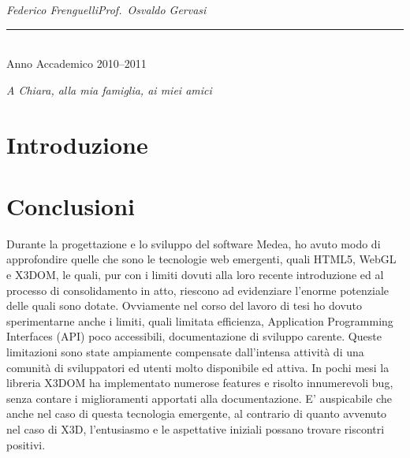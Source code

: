 \documentclass[a4paper,12pt]{report}
\def\laureando{Federico Frenguelli}
\def\annoaccademico{2010--2011}
\def\dedica{A Chiara, alla mia famiglia, ai miei amici}
\newlength\corpo
\begin{document}
\begin{titlepage}
\hspace{0.0cm}\emph{\laureando}\hfill\emph{Prof.~Osvaldo Gervasi}\par

\vfill


\begin{center}

\rule{40mm}{0.01mm}\\

Anno Accademico \annoaccademico

\end{center}

\end{titlepage}
\newpage
\vspace*{2.5cm}
\begin{flushright}
\begin{Large}\emph{\dedica}\end{Large}
\end{flushright}
\frenchspacing
%

\tableofcontents
\listoffigures
{}
\chapter*{Introduzione}
\pagestyle{fancy}
\fancyfoot[RO]{\thepage \hfil}



\chapter*{Conclusioni}
Durante la progettazione e lo sviluppo del software Medea, ho avuto modo di approfondire quelle che sono le  tecnologie web emergenti, quali HTML5, WebGL e X3DOM, le quali, pur con i limiti dovuti alla loro recente introduzione ed al processo di consolidamento in atto,  riescono ad evidenziare l'enorme potenziale delle quali sono dotate. Ovviamente nel corso del lavoro di tesi ho dovuto sperimentarne anche i limiti, quali limitata efficienza, Application Programming Interfaces (API) poco accessibili, documentazione di sviluppo carente. Queste limitazioni sono state ampiamente compensate dall'intensa attività di una comunità di sviluppatori ed utenti molto disponibile ed attiva. In pochi mesi la libreria X3DOM ha implementato numerose features e risolto innumerevoli bug, senza contare i miglioramenti apportati alla documentazione. E' auspicabile che anche nel caso di questa tecnologia emergente, al contrario di quanto avvenuto nel caso di X3D, l'entusiasmo e le aspettative iniziali possano trovare riscontri positivi. 
\end{document}
